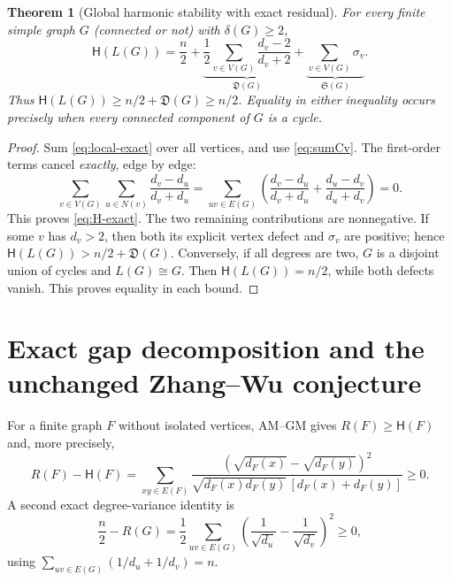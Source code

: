 \documentclass[11pt,a4paper]{article}
\newtheorem{theorem}{Theorem}[section]
\theoremstyle{remark}
\newcommand{\Def}{\mathfrak D}
\newcommand{\Sl}{\mathfrak S}
\newcommand{\HH}{\mathsf H}
\begin{document}
\begin{theorem}[Global harmonic stability with exact residual]\label{thm:harmonic}
For every finite simple graph $G$ (connected or not) with $\delta(G)\ge2$,
\begin{equation}\label{eq:H-exact}
 \HH(L(G))=\frac n2+\underbrace{\frac12\sum_{v\in V(G)}\frac{d_v-2}{d_v+2}}_{\displaystyle\Def(G)}
 +\underbrace{\sum_{v\in V(G)}\sigma_v}_{\displaystyle\Sl(G)}.
\end{equation}
Thus $\HH(L(G))\ge n/2+\Def(G)\ge n/2$. Equality in either inequality occurs precisely when every connected component of $G$ is a cycle.
\end{theorem}
\begin{proof}
Sum \eqref{eq:local-exact} over all vertices, and use \eqref{eq:sumCv}. The first-order terms cancel \emph{exactly}, edge by edge:
\begin{equation}\label{eq:antisym}
 \sum_{v\in V(G)}\sum_{u\in N(v)}\frac{d_v-d_u}{d_v+d_u}
 =\sum_{uv\in E(G)}\left(\frac{d_v-d_u}{d_v+d_u}
 +\frac{d_u-d_v}{d_u+d_v}\right)=0.
\end{equation}
This proves \eqref{eq:H-exact}. The two remaining contributions are nonnegative. If some $v$ has $d_v>2$, then both its explicit vertex defect and $\sigma_v$ are positive; hence $\HH(L(G))>n/2+\Def(G)$. Conversely, if all degrees are two, $G$ is a disjoint union of cycles and $L(G)\cong G$. Then $\HH(L(G))=n/2$, while both defects vanish. This proves equality in each bound.
\end{proof}

\section{Exact gap decomposition and the unchanged Zhang--Wu conjecture}
For a finite graph $F$ without isolated vertices, AM--GM gives $R(F)\ge\HH(F)$ and, more precisely,
\begin{equation}\label{eq:AG}
 R(F)-\HH(F)=\sum_{xy\in E(F)}\frac{(\sqrt{d_F(x)}-\sqrt{d_F(y)})^2}
 {\sqrt{d_F(x)d_F(y)}\,[d_F(x)+d_F(y)]}\ge0.
\end{equation}
A second exact degree-variance identity is
\begin{equation}\label{eq:variance}
 \frac n2-R(G)=\frac12\sum_{uv\in E(G)}
 \left(\frac1{\sqrt{d_u}}-\frac1{\sqrt{d_v}}\right)^2\ge0,
\end{equation}
using $\sum_{uv\in E(G)}(1/d_u+1/d_v)=n$.
\end{document}
